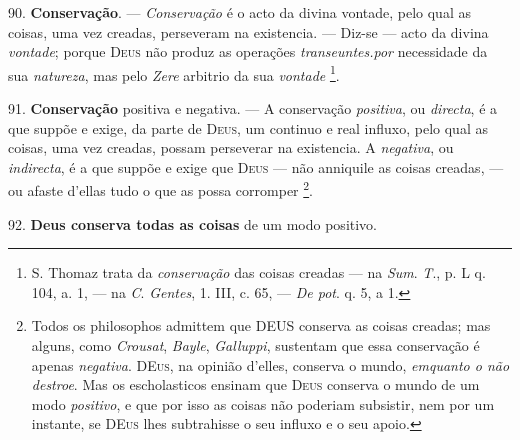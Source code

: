 90. \textbf{Conservação}. --- \emph{Conservação} é o acto da divina vontade, pelo qual as coisas, uma vez creadas, perseveram na existencia. --- Diz-se --- acto da divina \emph{vontade}; porque \textsc{Deus} não produz as operações \emph{transeuntes.por} necessidade da sua \emph{natureza}, mas pelo \emph{Zere} arbitrio da sua \emph{vontade} \footnote{S. Thomaz trata da \emph{conservação} das coisas creadas --- na \emph{Sum}. \emph{T}., p. L q. 104, a. 1, --- na \emph{C}. \emph{Gentes}, 1. III, c. 65, --- \emph{De pot}. q. 5, a 1.}.

91. \textbf{Conservação} positiva e negativa. --- A conservação \emph{positiva}, ou \emph{directa}, é a que suppõe e exige, da parte de \textsc{Deus}, um   continuo e real influxo, pelo qual as coisas, uma vez creadas, possam perseverar na existencia. A \emph{negativa}, ou \emph{indirecta}, é a que suppõe e exige que \textsc{Deus} --- não anniquile as coisas creadas, --- ou afaste d'ellas tudo o que as possa corromper \footnote{Todos os philosophos admittem que \textsc{DEUS} conserva as coisas creadas; mas alguns, como \emph{Crousat}, \emph{Bayle}, \emph{Galluppi}, sustentam que essa conservação é apenas \emph{negativa}. \textsc{DEus}, na opinião d'elles, conserva o mundo, \emph{emquanto o não destroe}. Mas os escholasticos ensinam que \textsc{Deus} conserva o mundo de um modo \emph{positivo}, e que por isso as coisas não poderiam subsistir, nem por um instante, se \textsc{DEus} lhes subtrahisse o seu influxo e o seu apoio.}.

92. \textbf{Deus conserva todas as coisas} de um modo positivo.

